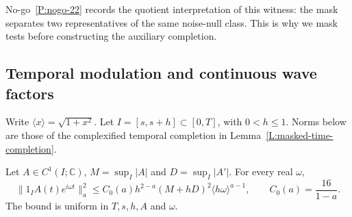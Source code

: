 No-go~\ref{P:nogo-22} records the quotient interpretation of this witness:
the mask separates two representatives of the same noise-null class.
This is why we mask tests before constructing the auxiliary completion.


\subsection{Temporal modulation and continuous wave factors}

Write $\langle x\rangle = \sqrt{1+x^2}$. Let $I = [s,s+h] \subset [0,T]$, with
$0 < h \le 1$. Norms below are those of the complexified temporal completion in
Lemma~\ref{L:masked-time-completion}.

\begin{lemma}\label{L:masked-temporal-modulation}
  Let $A \in C^1(I;\mathbb{C})$, $M = \sup_I|A|$ and $D = \sup_I|A'|$. For every
  real $\omega$,
  \begin{equation}\label{E:masked-temporal-modulation}
    \|1_IA(t)e^{i\omega t}\|_a^2
    \le C_0(a)h^{2-a}(M+hD)^2\langle h\omega\rangle^{a-1},
    \qquad C_0(a) = \frac{16}{1-a}.
  \end{equation}
  The bound is uniform in $T,s,h,A$ and $\omega$.
\end{lemma}

